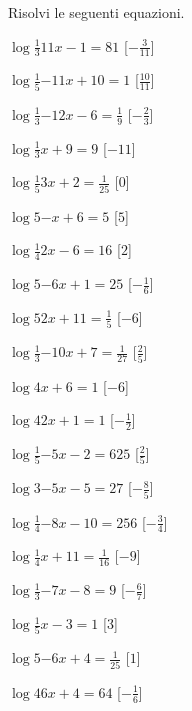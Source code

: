 \begin{esercizio}\label{ese:}
 Risolvi le seguenti equazioni.
\begin{multicols}{2}
 \begin{enumeratea}
  \item  \(\log{\frac{1}{3}}{11 x -1} = 81\)
   \hfill [\( -\frac{3}{11} \)]
  \item  \(\log{\frac{1}{5}}{-11 x +10} = 1\)
   \hfill [\( \frac{10}{11} \)]
  \item  \(\log{\frac{1}{3}}{-12 x -6} = \frac{1}{9}\)
   \hfill [\( -\frac{2}{3} \)]
  \item  \(\log{\frac{1}{3}}{x +9} = 9\)
   \hfill [\( -11 \)]
  \item  \(\log{\frac{1}{5}}{3 x +2} = \frac{1}{25}\)
   \hfill [\( 0 \)]
  \item  \(\log{5}{- x +6} = 5\)
   \hfill [\( 5 \)]
  \item  \(\log{\frac{1}{4}}{2 x -6} = 16\)
   \hfill [\( 2 \)]
  \item  \(\log{5}{-6 x +1} = 25\)
   \hfill [\( -\frac{1}{6} \)]
  \item  \(\log{5}{2 x +11} = \frac{1}{5}\)
   \hfill [\( -6 \)]
  \item  \(\log{\frac{1}{3}}{-10 x +7} = \frac{1}{27}\)
   \hfill [\( \frac{2}{5} \)]
  \item  \(\log{4}{x +6} = 1\)
   \hfill [\( -6 \)]
  \item  \(\log{4}{2 x +1} = 1\)
   \hfill [\( -\frac{1}{2} \)]
  \item  \(\log{\frac{1}{5}}{-5 x -2} = 625\)
   \hfill [\( \frac{2}{5} \)]
  \item  \(\log{3}{-5 x -5} = 27\)
   \hfill [\( -\frac{8}{5} \)]
  \item  \(\log{\frac{1}{4}}{-8 x -10} = 256\)
   \hfill [\( -\frac{3}{4} \)]
  \item  \(\log{\frac{1}{4}}{x +11} = \frac{1}{16}\)
   \hfill [\( -9 \)]
  \item  \(\log{\frac{1}{3}}{-7 x -8} = 9\)
   \hfill [\( -\frac{6}{7} \)]
  \item  \(\log{\frac{1}{5}}{x -3} = 1\)
   \hfill [\( 3 \)]
  \item  \(\log{5}{-6 x +4} = \frac{1}{25}\)
   \hfill [\( 1 \)]
  \item  \(\log{4}{6 x +4} = 64\)
   \hfill [\( -\frac{1}{6} \)]
 \end{enumeratea}
\end{multicols}
\end{esercizio}



